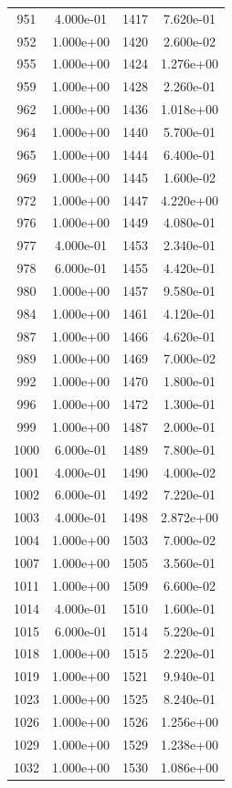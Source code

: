 \documentclass[12pt]{article}
\begin{document}
\begin{longtable}{@{}cccc@{}}
951 & 4.000e-01 & 1417 & 7.620e-01 \\
952 & 1.000e+00 & 1420 & 2.600e-02 \\
955 & 1.000e+00 & 1424 & 1.276e+00 \\
959 & 1.000e+00 & 1428 & 2.260e-01 \\
962 & 1.000e+00 & 1436 & 1.018e+00 \\
964 & 1.000e+00 & 1440 & 5.700e-01 \\
965 & 1.000e+00 & 1444 & 6.400e-01 \\
969 & 1.000e+00 & 1445 & 1.600e-02 \\
972 & 1.000e+00 & 1447 & 4.220e+00 \\
976 & 1.000e+00 & 1449 & 4.080e-01 \\
977 & 4.000e-01 & 1453 & 2.340e-01 \\
978 & 6.000e-01 & 1455 & 4.420e-01 \\
980 & 1.000e+00 & 1457 & 9.580e-01 \\
984 & 1.000e+00 & 1461 & 4.120e-01 \\
987 & 1.000e+00 & 1466 & 4.620e-01 \\
989 & 1.000e+00 & 1469 & 7.000e-02 \\
992 & 1.000e+00 & 1470 & 1.800e-01 \\
996 & 1.000e+00 & 1472 & 1.300e-01 \\
999 & 1.000e+00 & 1487 & 2.000e-01 \\
1000 & 6.000e-01 & 1489 & 7.800e-01 \\
1001 & 4.000e-01 & 1490 & 4.000e-02 \\
1002 & 6.000e-01 & 1492 & 7.220e-01 \\
1003 & 4.000e-01 & 1498 & 2.872e+00 \\
1004 & 1.000e+00 & 1503 & 7.000e-02 \\
1007 & 1.000e+00 & 1505 & 3.560e-01 \\
1011 & 1.000e+00 & 1509 & 6.600e-02 \\
1014 & 4.000e-01 & 1510 & 1.600e-01 \\
1015 & 6.000e-01 & 1514 & 5.220e-01 \\
1018 & 1.000e+00 & 1515 & 2.220e-01 \\
1019 & 1.000e+00 & 1521 & 9.940e-01 \\
1023 & 1.000e+00 & 1525 & 8.240e-01 \\
1026 & 1.000e+00 & 1526 & 1.256e+00 \\
1029 & 1.000e+00 & 1529 & 1.238e+00 \\
1032 & 1.000e+00 & 1530 & 1.086e+00 \\

\end{longtable}
\end{document}
